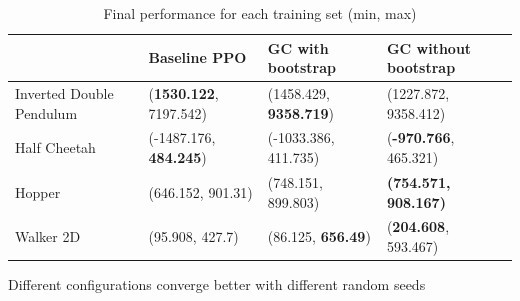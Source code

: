 \begin{table}
  \begin{center}
\begin{tabular}{p{}|p{}p{}p{}}
    \hline
    & Baseline PPO & GC with bootstrap & GC without bootstrap \\
    \hline
    Inverted Double Pendulum & (\textbf{1530.122}, 7197.542) & (1458.429, \textbf{9358.719}) & (1227.872, 9358.412) \\
    \hline
    Half Cheetah & (-1487.176, \textbf{484.245}) & (-1033.386, 411.735) & (\textbf{-970.766}, 465.321)\\
    \hline
    Hopper & (646.152, 901.31) & (748.151, 899.803) & \textbf{(754.571, 908.167)} \\
    \hline
    Walker 2D & (95.908, 427.7) & (86.125, \textbf{656.49}) & (\textbf{204.608}, 593.467) \\
    \hline  
\end{tabular}
  \end{center}
  \caption{Final performance for each training set (min, max)}
  \label{hyperparameters}
\end{table}

Different configurations converge better with different random seeds


